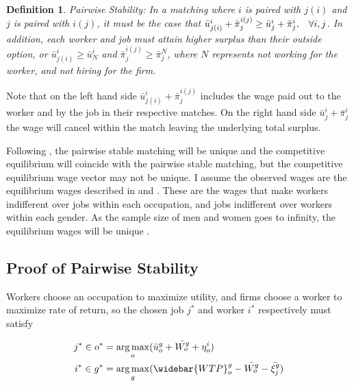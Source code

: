 \documentclass[12pt]{article}
\newtheorem{definition}{Definition}
\DeclareMathOperator*{\argmax}{arg\,max}
\begin{document}
\begin{definition}
Pairwise Stability: In a matching where $i$ is paired with $j(i)$ and $j$ is paired with $i(j)$, it must be the case that $\bar{u}^{i}_{j(i)}+ \bar{\pi}^{i(j)}_j \geq \bar{u}^{i}_{j} + \bar{\pi}^{i}_j, \hspace{3mm}  \forall i,j$. In addition, each worker and job must attain higher surplus than their outside option, or $\bar{u}^{i}_{j(i)} \geq \bar{u}^{i}_{N}$ and $\bar{\pi}^{i(j)}_j \geq \bar{\pi}^{N}_j $, where $N$ represents not working for the worker, and not hiring for the firm.
 \end{definition}
 
Note that on the left hand side $\bar{u}^{i}_{j(i)}+ \bar{\pi}^{i(j)}_j$ includes the wage paid out to the worker and by the job in their respective matches. On the right hand side $\bar{u}^{i}_{j} + \bar{\pi}^{i}_j$ the wage will cancel within the match leaving the underlying total surplus. 


Following , the pairwise stable matching will be unique and the competitive equilibrium will coincide with the pairwise stable matching, but the competitive equilibrium wage vector may not be unique. I assume the observed wages are the equilibrium wages described in  and . These are the wages that make workers indifferent over jobs within each occupation, and jobs indifferent over workers within each gender. As the sample size of men and women goes to infinity, the equilibrium wages will be unique \cite{Salanie2013a}.

\subsection{Proof of Pairwise Stability}\label{sec.Stability}

Workers choose an occupation to maximize utility, and firms choose a worker to maximize rate of return, so the chosen job $j^*$ and worker $i^*$ respectively must satisfy

\begin{align*}
j^* \in o^* &= \argmax_o ( \bar{u}^{g}_o + \bar{W^g_o}   + \eta^i_o ) \\
i^* \in g^* &= \argmax_g (\widebar{WTP}^g_o -  \bar{W^g_o} - \bar{\xi^g_j})
\end{align*}
\end{document}

